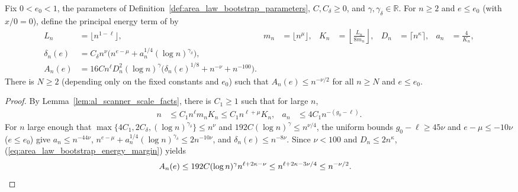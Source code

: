 \begin{lemma}
    \label{thm:area_law_bootstrap_principal_energy}
    \leanok
    Fix $0<e_0<1$, the parameters of
    Definition~\ref{def:area_law_bootstrap_parameters}, $C,C_\delta\ge0$, and
    $\gamma,\gamma_\delta\in\mathbb R$. For $n\ge2$ and $e\le e_0$ (with
    $x/0=0$), define the principal energy term of
    \cite[Section~9, lines~731--755]{OpenAI2026AreaLaw} by
    \begin{align}
        L_n         & =\lfloor n^{1-\ell}\rfloor,                 &
        m_n         & =\lfloor n^\mu\rfloor,                      &
        K_n         & =\left\lfloor\frac{L_n}{8m_n}\right\rfloor, &
        D_n         & =\lceil n^\kappa\rceil,                     & a_n & =\frac4{K_n},
        \label{eq:al_principal_energy_scales}                                           \\
        \delta_n(e) & =C_\delta n^\nu
        \bigl(n^{e-\mu}+a_n^{1/4}(\log n)^{\gamma_\delta}\bigr),
        \label{eq:al_principal_energy_density}                                          \\
        A_n(e)      & =16C n^\ell D_n^2(\log n)^\gamma
        \bigl(\delta_n(e)^{1/8}+n^{-\nu}+n^{-100}\bigr).
        \label{eq:al_principal_energy_term}
    \end{align}
    There is $N\ge2$ (depending only on the fixed constants and $e_0$) such
    that $A_n(e)\le n^{-\nu/2}$ for all $n\ge N$ and $e\le e_0$.
\end{lemma}
\begin{proof}\leanok
    By Lemma~\ref{lem:al_scanner_scale_facts}, there is $C_1\ge1$ such that for
    large $n$,
    \begin{align}
        n   & \le C_1n^\ell m_nK_n\le C_1n^{\ell+\mu}K_n, &
        a_n & \le4C_1n^{-(g_0-\ell)}.
        \label{eq:al_principal_energy_band}
    \end{align}
    For $n$ large enough that $\max\{4C_1,2C_\delta,(\log n)^{\gamma_\delta}\}\le n^\nu$
    and $192C(\log n)^\gamma\le n^{\nu/4}$, the uniform bounds $g_0-\ell\ge45\nu$
    and $e-\mu\le-10\nu$ ($e\le e_0$) give $a_n\le n^{-44\nu}$,
    $n^{e-\mu}+a_n^{1/4}(\log n)^{\gamma_\delta}\le2n^{-10\nu}$, and
    $\delta_n(e)\le n^{-8\nu}$. Since $\nu<100$ and $D_n\le2n^\kappa$,
    (\ref{eq:area_law_bootstrap_energy_margin}) yields
    \begin{align}
        A_n(e)
         & \le192C(\log n)^\gamma n^{\ell+2\kappa-\nu}
        \le n^{\ell+2\kappa-3\nu/4}
        \le n^{-\nu/2}. \notag
    \end{align}
\end{proof}

